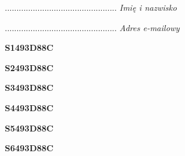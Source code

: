 \begin{turn}{90}\begin{minipage}{\linewidth} \vspace{20mm} ................................................  \textit{Imię i nazwisko}\end{minipage}\end{turn}

\begin{turn}{90}\begin{minipage}{\linewidth} \vspace{20mm} ................................................  \textit{Adres e-mailowy}\end{minipage}\end{turn}

\begin{turn}{90}\huge \begin{minipage}{\linewidth} \vspace{10mm}\textbf{S1493D88C}\end{minipage}\end{turn}

\begin{turn}{90}\huge \begin{minipage}{\linewidth} \vspace{10mm}\textbf{S2493D88C}\end{minipage}\end{turn}

\begin{turn}{90}\huge \begin{minipage}{\linewidth} \vspace{10mm}\textbf{S3493D88C}\end{minipage}\end{turn}

\begin{turn}{90}\huge \begin{minipage}{\linewidth} \vspace{10mm}\textbf{S4493D88C}\end{minipage}\end{turn}

\begin{turn}{90}\huge \begin{minipage}{\linewidth} \vspace{10mm}\textbf{S5493D88C}\end{minipage}\end{turn}

\begin{turn}{90}\huge \begin{minipage}{\linewidth} \vspace{10mm}\textbf{S6493D88C}\end{minipage}\end{turn}

